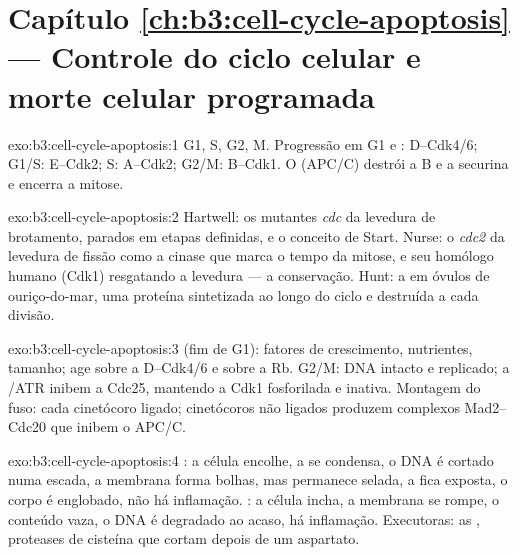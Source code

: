 \section*{Capítulo \ref{ch:b3:cell-cycle-apoptosis} --- Controle do ciclo celular e morte celular programada}

\begin{solution}{exo:b3:cell-cycle-apoptosis:1}
G1, S, G2, M. Progressão em G1 e : 
D--Cdk4/6; G1/S:  E--Cdk2; S:  A--Cdk2; G2/M: 
B--Cdk1. O  (APC/C) destrói a  B e a
securina e encerra a mitose.
\end{solution}

\begin{solution}{exo:b3:cell-cycle-apoptosis:2}
Hartwell: os mutantes \emph{cdc} da levedura de brotamento, parados em
etapas definidas, e o conceito de Start. Nurse: o \emph{cdc2} da
levedura de fissão como a cinase que marca o tempo da mitose, e seu
homólogo humano (Cdk1) resgatando a levedura --- a conservação. Hunt: a
 em óvulos de ouriço-do-mar, uma proteína sintetizada ao longo
do ciclo e destruída a cada divisão.
\end{solution}

\begin{solution}{exo:b3:cell-cycle-apoptosis:3}
 (fim de G1): fatores de crescimento, nutrientes,
tamanho; age sobre a  D--Cdk4/6 e sobre a Rb. G2/M: DNA intacto
e replicado; a /ATR inibem a Cdc25, mantendo a Cdk1 fosforilada e
inativa. Montagem do fuso: cada cinetócoro ligado; cinetócoros não
ligados produzem complexos Mad2--Cdc20 que inibem o APC/C.
\end{solution}

\begin{solution}{exo:b3:cell-cycle-apoptosis:4}
: a célula encolhe, a  se condensa, o DNA é cortado
numa escada, a membrana forma bolhas, mas permanece selada, a
 fica exposta, o corpo é englobado, não há inflamação.
: a célula incha, a membrana se rompe, o conteúdo vaza, o DNA é
degradado ao acaso, há inflamação. Executoras: as , proteases
de cisteína que cortam depois de um aspartato.
\end{solution}

